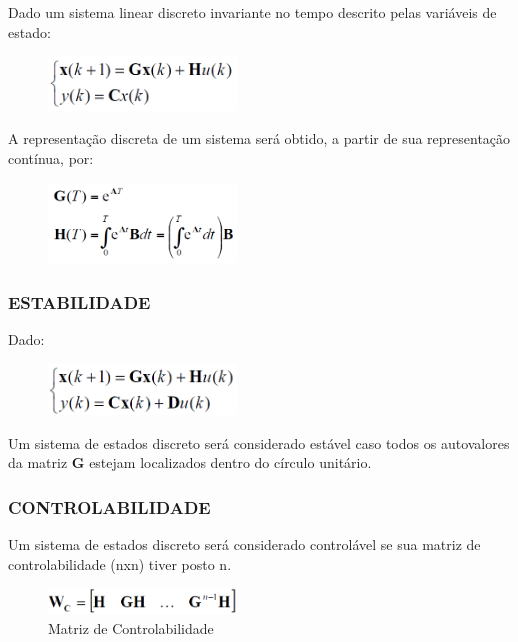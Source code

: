 \documentclass[a4paper,12pt]{article}
\begin{document}
\hspace{4ex}Dado um sistema linear discreto invariante no tempo descrito pelas variáveis de estado:

\begin{figure}[H]
\centering
\includegraphics[width=5cm]{imagens-6/1.png}
\end{figure}


A representação discreta de um sistema será obtido, a partir de sua representação contínua, por:
\begin{figure}[H]
\centering
\includegraphics[width=5cm]{imagens-6/18.png}
\end{figure}


\subsubsection{ESTABILIDADE}
Dado:
\begin{figure}[H]
\centering
\includegraphics[width=5cm]{imagens-6/19.png}
\end{figure}
Um sistema de estados discreto será considerado estável caso todos os autovalores da matriz \textbf{G} estejam localizados dentro do círculo unitário.

\subsubsection{CONTROLABILIDADE}
Um sistema de estados discreto será considerado controlável se sua matriz de controlabilidade (nxn) tiver posto n.

\begin{figure}[H]
\centering
\includegraphics[width=5cm]{imagens-6/20.png}
\caption{Matriz de Controlabilidade}
\end{figure}
\end{document}
